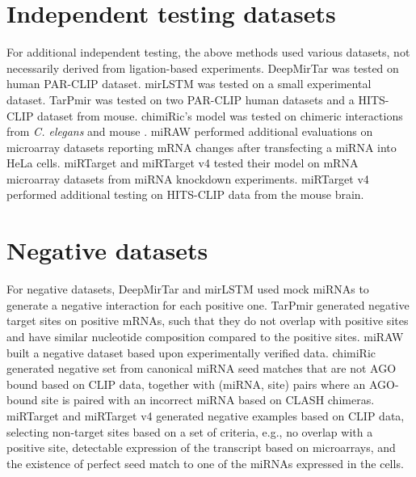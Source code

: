 
\section{Independent testing datasets}
For additional independent testing, the above methods used various datasets, not necessarily derived from ligation-based experiments. DeepMirTar \cite{wen2018deepmirtar} was tested on human PAR-CLIP dataset. mirLSTM \cite{paker2019mirlstm} was tested on a small experimental dataset. TarPmir \cite{ding2016tarpmir} was tested on two PAR-CLIP human datasets and a HITS-CLIP dataset from mouse. chimiRic's \cite{lu2016learning} model was tested on chimeric interactions from  \textit{C. elegans} \cite{grosswendt2014unambiguous} and mouse \cite{darnell_moore2015mirna}. 
miRAW \cite{pla2018miraw} performed additional evaluations on microarray datasets reporting mRNA changes after transfecting a miRNA into HeLa cells. miRTarget \cite{wang2016improving} and miRTarget v4 \cite{liu2019prediction} tested their model on mRNA microarray datasets from miRNA knockdown experiments. miRTarget v4 performed additional testing on HITS-CLIP data from the mouse brain.

\section{Negative datasets}
For negative datasets, DeepMirTar \cite{wen2018deepmirtar} and mirLSTM \cite{paker2019mirlstm} used mock miRNAs to generate a negative interaction for each positive one. TarPmir \cite{ding2016tarpmir} generated negative target sites on positive mRNAs, such that they do not overlap with positive sites and have similar nucleotide composition compared to the positive sites. miRAW built a negative dataset based upon experimentally verified data. chimiRic \cite{lu2016learning} generated negative set from canonical miRNA seed matches that are not AGO bound based on CLIP data, together with (miRNA, site) pairs where an AGO-bound site is paired with an incorrect miRNA based on CLASH chimeras. miRTarget \cite{wang2016improving} and miRTarget v4 \cite{liu2019prediction} generated negative examples based on CLIP data, selecting non-target sites based on a set of criteria, e.g., no overlap with a positive site, detectable expression of the transcript based on microarrays, and the existence of perfect seed match to one of the miRNAs expressed in the cells.



